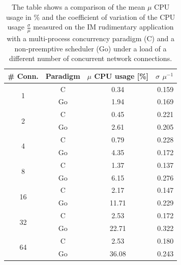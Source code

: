 \begin{table}[h]
	\centering
\begin{tabular}{|c|ccr|}
		\hline
	\# Conn.         &  Paradigm    & $\mu$ CPU usage [\%] & $\sigma$ $\mu^{-1}$ \\
	\hline
	\multirow{2}{*}{1} & C & 0.34 & 0.159   \\
	&\cellcolor[gray]{0.9} Go &\cellcolor[gray]{0.9} 1.94 &\cellcolor[gray]{0.9} 0.169  \\ \hline
	\multirow{2}{*}{2} & C & 0.45 & 0.221   \\
	&\cellcolor[gray]{0.9} Go &\cellcolor[gray]{0.9} 2.61 &\cellcolor[gray]{0.9} 0.205  \\ \hline
	\multirow{2}{*}{4} & C & 0.79 & 0.228   \\
&\cellcolor[gray]{0.9} Go &\cellcolor[gray]{0.9} 4.35 &\cellcolor[gray]{0.9} 0.172  \\ \hline
	\multirow{2}{*}{8} & C & 1.37 & 0.137   \\
&\cellcolor[gray]{0.9} Go &\cellcolor[gray]{0.9} 6.15 &\cellcolor[gray]{0.9} 0.276  \\ \hline
	\multirow{2}{*}{16} & C & 2.17 & 0.147   \\
&\cellcolor[gray]{0.9} Go &\cellcolor[gray]{0.9} 11.71 &\cellcolor[gray]{0.9} 0.229  \\ \hline
	\multirow{2}{*}{32} & C & 2.53 & 0.172   \\
&\cellcolor[gray]{0.9} Go &\cellcolor[gray]{0.9} 22.71 &\cellcolor[gray]{0.9} 0.322  \\ \hline
	\multirow{2}{*}{64} & C & 2.53 & 0.180   \\
&\cellcolor[gray]{0.9} Go &\cellcolor[gray]{0.9} 36.08 &\cellcolor[gray]{0.9} 0.243  \\ \hline
\end{tabular}
\bigskip	
\caption{The table shows a comparison of the mean $\mu$ CPU usage in \% and the coefficient of variation of the CPU usage $\frac{\sigma}{\mu}$ measured on the IM rudimentary application with a multi-process concurrency paradigm (C) and a non-preemptive scheduler (Go) under a load of a different number of concurrent network connections.}
\label{tab_results}
\end{table}

